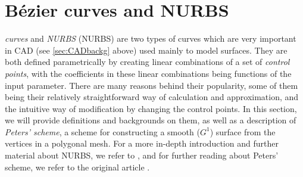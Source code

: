 \section{B{\'e}zier curves and \acs{NURBS}}
\label{sec:NURBS}


\emph{\Bez curves} and \emph{\acl{NURBS}} (\acs{NURBS}) are two types of curves which are very important in CAD (see \autoref{sec:CADbackg} above) used mainly to model surfaces. They are both defined parametrically by creating linear combinations of a set of \emph{control points}, with the coefficients in these linear combinations being functions of the input parameter. There are many reasons behind their popularity, some of them being their relatively straightforward way of calculation and approximation, and the intuitive way of modification by changing the control points. In this section, we will provide definitions and backgrounds on them, as well as a description of \emph{Peters' scheme}, a scheme for constructing a smooth ($G^1$) surface from the vertices in a polygonal mesh. For a  more in-depth introduction and further material about NURBS, we refer to \cite{farin2002handbook}, and for further reading about Peters' scheme, we refer to the original article \cite{peters1992constructing}.



